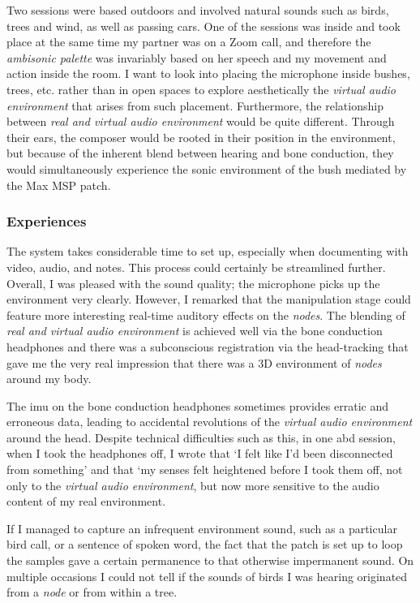 Two sessions were based outdoors and involved natural sounds such as birds, trees and wind, as well as passing cars. One of the sessions was inside and took place at the same time my partner was on a Zoom call, and therefore the \textit{ambisonic palette} was invariably based on her speech and my movement and action inside the room. I want to look into placing the microphone inside bushes, trees, etc. rather than in open spaces to explore aesthetically the \textit{virtual audio environment} that arises from such placement. Furthermore, the relationship between \textit{real and virtual audio environment} would be quite different. Through their ears, the composer would be rooted in their position in the environment, but because of the inherent blend between hearing and bone conduction, they would simultaneously experience the sonic environment of the bush mediated by the Max MSP patch.

\subsubsection{Experiences}\label{sec: area-study-results-experiences}
The system takes considerable time to set up, especially when documenting with video, audio, and notes. This process could certainly be streamlined further. Overall, I was pleased with the sound quality; the microphone picks up the environment very clearly. However, I remarked that the manipulation stage could feature more interesting real-time auditory effects on the \textit{nodes}. The blending of \textit{real and virtual audio environment} is achieved well via the bone conduction headphones and there was a subconscious registration via the head-tracking that gave me the very real impression that there was a 3D environment of \textit{nodes} around my body.

The \gls{imu} on the bone conduction headphones sometimes provides erratic and erroneous data, leading to accidental revolutions of the \textit{virtual audio environment} around the head. Despite technical difficulties such as this, in one \gls{abd} session, when I took the headphones off, I wrote that `I felt like I'd been disconnected from something' and that `my senses felt heightened before I took them off, not only to the \textit{virtual audio environment}, but now more sensitive to the audio content of my real environment.

If I managed to capture an infrequent environment sound, such as a particular bird call, or a sentence of spoken word, the fact that the patch is set up to loop the samples gave a certain permanence to that otherwise impermanent sound. On multiple occasions I could not tell if the sounds of birds I was hearing originated from a \textit{node} or from within a tree.

